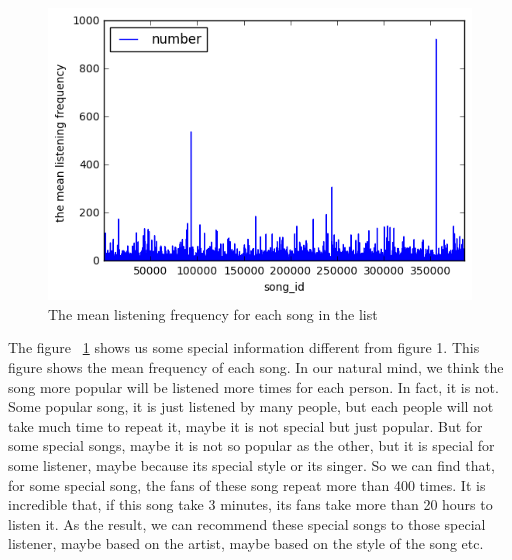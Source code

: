 \documentclass{article}
\begin{document}
\label{data}
\begin{figure}[ht]
\vskip 0.2in
\begin{center}
\centerline{\includegraphics[width=\columnwidth]{mean_fre}}
\caption{The mean listening frequency for each song in the list}
\label{fig:mean_frequency}
\end{center}
\vskip -0.2in
\end{figure} 
The figure ~\ref{fig:mean_frequency} shows us some special information different from figure 1. This figure shows the  mean frequency of each song. In our natural mind, we think the song more popular will be listened more times for each person. In fact, it is not. Some popular song, it is just listened by many people, but each people will not take much time to repeat it, maybe it is not special but just popular. But for some special songs, maybe it is not so popular as the other, but it is special for some listener, maybe because its special style or its singer. So we can find that, for some special song, the fans of these song repeat more than 400 times. It is incredible that, if this song take 3 minutes, its fans take more than 20 hours to listen it.  As the result, we can recommend these special songs to those special listener, maybe based on the artist, maybe based on the style of the song etc.
\end{document}
